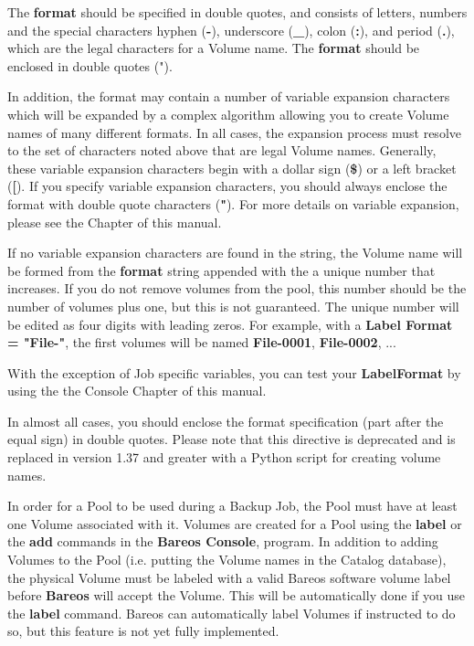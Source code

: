 \begin{description}
The {\bf format} should be specified in double quotes, and consists of
letters, numbers and the special characters hyphen ({\bf -}), underscore
({\bf \_}), colon ({\bf :}), and period ({\bf .}), which are the legal
characters for a Volume name.  The {\bf format} should be enclosed in
double quotes (").

In addition, the format may contain a number of variable expansion
characters which will be expanded by a complex algorithm allowing you to
create Volume names of many different formats.  In all cases, the
expansion process must resolve to the set of characters noted above that
are legal Volume names.  Generally, these variable expansion characters
begin with a dollar sign ({\bf \$}) or a left bracket ({\bf [}).  If you
specify variable expansion characters, you should always enclose the
format with double quote characters ({\bf "}).  For more details on
variable expansion, please see the  Chapter of this manual.

If no variable expansion characters are found in the string, the Volume
name will be formed from the {\bf format} string appended with the
a unique number that increases.  If you do not remove volumes from the
pool, this number should be the number of volumes plus one, but this
is not guaranteed. The unique number will be edited as four
digits with leading zeros.  For example, with a {\bf Label Format =
"File-"}, the first volumes will be named {\bf File-0001}, {\bf
File-0002}, ...

With the exception of Job specific variables, you can test your {\bf
LabelFormat} by using the  the Console Chapter
of this manual.

In almost all cases, you should enclose the format specification (part
after the equal sign) in double quotes.  Please note that this directive
is deprecated and is replaced in version 1.37 and greater with a Python
script for creating volume names.
\end{description}

In order for a Pool to be used during a Backup Job, the Pool must have at
least one Volume associated with it.  Volumes are created for a Pool using
the {\bf label} or the {\bf add} commands in the {\bf Bareos Console},
program.  In addition to adding Volumes to the Pool (i.e.  putting the
Volume names in the Catalog database), the physical Volume must be labeled
with a valid Bareos software volume label before {\bf Bareos} will accept
the Volume.  This will be automatically done if you use the {\bf label}
command.  Bareos can automatically label Volumes if instructed to do so,
but this feature is not yet fully implemented.

